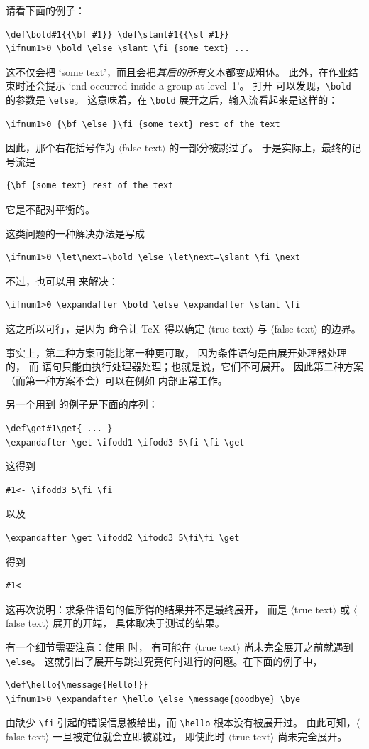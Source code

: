 \documentclass[a4paper]{rapport3}
\def\gr#1{$\langle$#1$\rangle$}\def\key#1{{\tt#1}}
\def\gram#1{\gr{#1}}%
\begin{document}
请看下面的例子：
\begin{verbatim}
\def\bold#1{{\bf #1}} \def\slant#1{{\sl #1}}
\ifnum1>0 \bold \else \slant \fi {some text} ...
\end{verbatim}
这不仅会把 `some text'，而且会把{\sl 其后的所有\/}文本都变成粗体。
此外，在作业结束时还会提示
`end occurred inside a group at level~1'。
打开  可以发现，\verb.\bold. 的参数是 \verb.\else.。
这意味着，在 \verb.\bold. 展开之后，输入流看起来是这样的：
\begin{verbatim}
\ifnum1>0 {\bf \else }\fi {some text} rest of the text 
\end{verbatim}
因此，那个右花括号作为 \gram{false text} 的一部分被跳过了。
于是实际上，最终的记号流是
\begin{verbatim}
{\bf {some text} rest of the text
\end{verbatim}
它是不配对平衡的。

这类问题的一种解决办法是写成
\begin{verbatim}
\ifnum1>0 \let\next=\bold \else \let\next=\slant \fi \next
\end{verbatim}
不过，也可以用  来解决：
\begin{verbatim}
\ifnum1>0 \expandafter \bold \else \expandafter \slant \fi
\end{verbatim}
这之所以可行，是因为  命令让 \TeX\ 得以确定
\gram{true text} 与 \gram{false text} 的边界。

事实上，第二种方案可能比第一种更可取，
因为条件语句是由展开处理器处理的，
而  语句只能由执行处理器处理；也就是说，它们不可展开。
因此第二种方案（而第一种方案不会）可以在例如  内部正常工作。

另一个用到  的例子是下面的序列：
\begin{verbatim}
\def\get#1\get{ ... }
\expandafter \get \ifodd1 \ifodd3 5\fi \fi \get
\end{verbatim}
这得到\begin{verbatim}
#1<- \ifodd3 5\fi \fi
\end{verbatim}
以及
\begin{verbatim}
\expandafter \get \ifodd2 \ifodd3 5\fi\fi \get
\end{verbatim}
得到\begin{verbatim}
#1<-
\end{verbatim}
这再次说明：求条件语句的值所得的结果并不是最终展开，
而是 \gr{true text} 或 \gr{false text} 展开的开端，
具体取决于测试的结果。

有一个细节需要注意：使用  时，
有可能在 \gram{true text} 尚未完全展开之前就遇到 \verb.\else.。
这就引出了展开与跳过究竟何时进行的问题。在下面的例子中，
\begin{verbatim}
\def\hello{\message{Hello!}}
\ifnum1>0 \expandafter \hello \else \message{goodbye} \bye
\end{verbatim}
由缺少 \verb.\fi. 引起的错误信息被给出，而 \verb.\hello. 根本没有被展开过。
由此可知，\gram{false text} 一旦被定位就会立即被跳过，
即使此时 \gram{true text} 尚未完全展开。
\end{document}

